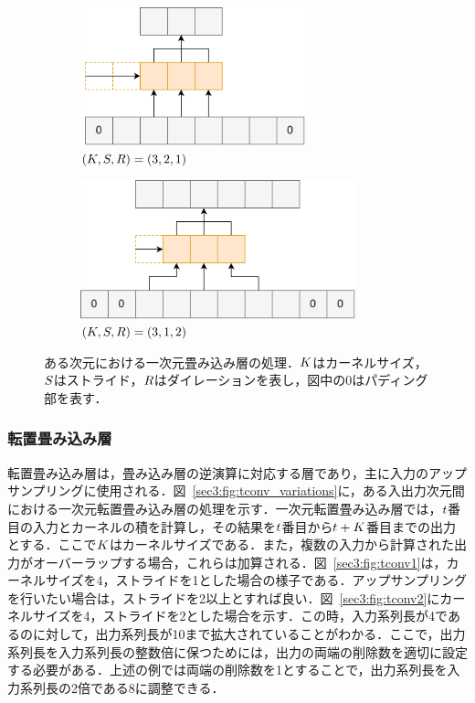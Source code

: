 \documentclass[12pt]{jarticle}
\numberwithin{equation}{section}    %
\numberwithin{figure}{section}      %
\numberwithin{table}{section}      %
\begin{document}
\begin{figure}[tb]
    \begin{subfigure}[b]{0.48\textwidth}
        \centering
        \includegraphics[height=4cm]{./figure/sec3/conv3.drawio.png}
        \caption{$\left(K, S, R\right) = \left(3, 2, 1\right)$}
        \label{sec3:fig:conv3}
    \end{subfigure}
    \begin{subfigure}[b]{0.48\textwidth}
        \centering
        \includegraphics[height=4cm]{./figure/sec3/conv4.drawio.png}
        \caption{$\left(K, S, R\right) = \left(3, 1, 2\right)$}
        \label{sec3:fig:conv4}
    \end{subfigure}
    \caption{ある次元における一次元畳み込み層の処理．$K$はカーネルサイズ，$S$はストライド，$R$はダイレーションを表し，図中の0はパディング部を表す．}
    \label{sec3:fig:conv_variations}
\end{figure}

\subsubsection{転置畳み込み層}
転置畳み込み層は，畳み込み層の逆演算に対応する層であり，主に入力のアップサンプリングに使用される．図~\ref{sec3:fig:tconv_variations}に，ある入出力次元間における一次元転置畳み込み層の処理を示す．一次元転置畳み込み層では，$t$番目の入力とカーネルの積を計算し，その結果を$t$番目から$t + K$番目までの出力とする．ここで$K$はカーネルサイズである．また，複数の入力から計算された出力がオーバーラップする場合，これらは加算される．図~\ref{sec3:fig:tconv1}は，カーネルサイズを4，ストライドを1とした場合の様子である．アップサンプリングを行いたい場合は，ストライドを2以上とすれば良い．図~\ref{sec3:fig:tconv2}にカーネルサイズを4，ストライドを2とした場合を示す．この時，入力系列長が4であるのに対して，出力系列長が10まで拡大されていることがわかる．ここで，出力系列長を入力系列長の整数倍に保つためには，出力の両端の削除数を適切に設定する必要がある．上述の例では両端の削除数を1とすることで，出力系列長を入力系列長の2倍である8に調整できる．
\end{document}
